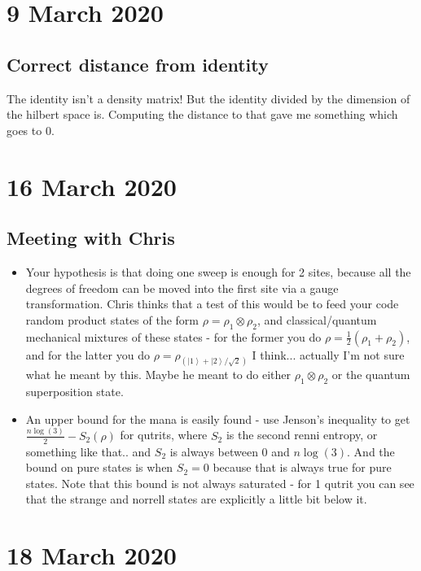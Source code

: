 \documentclass{report}
\begin{document}
\chapter{9 March 2020}

\section{Correct distance from identity}

The identity isn't a density matrix! But the identity divided by the dimension of the hilbert space is. Computing the distance to that gave me something which goes to 0. 

\chapter{16 March 2020}

\section{Meeting with Chris}

\begin{itemize}
\item Your hypothesis is that doing one sweep is enough for 2 sites, because all the degrees of freedom can be moved into the first site via a gauge transformation. Chris thinks that a test of this would be to feed your code random product states of the form $\rho=\rho_1\otimes \rho_2$, and classical/quantum mechanical mixtures of these states - for the former you do $\rho = \frac{1}{2}(\rho_1+\rho_2)$, and for the latter you do $\rho=\rho_{(\left|1\right>+\left|2\right>/\sqrt2)}$ I think... actually I'm not sure what he meant by this. Maybe he meant to do either $\rho_1\otimes \rho_2$ or the quantum superposition state.
\item An upper bound for the mana is easily found - use Jenson's inequality to get $\frac{n\log (3)}{2}-S_2(\rho)$ for qutrits, where $S_2$ is the second renni entropy, or something like that.. and $S_2$ is always between 0 and $n \log (3)$. And the bound on pure states is when $S_2=0$ because that is always true for pure states. Note that this bound is not always saturated - for 1 qutrit you can see that the strange and norrell states are explicitly a little bit below it.
\end{itemize}

\chapter{18 March 2020}
\end{document}

